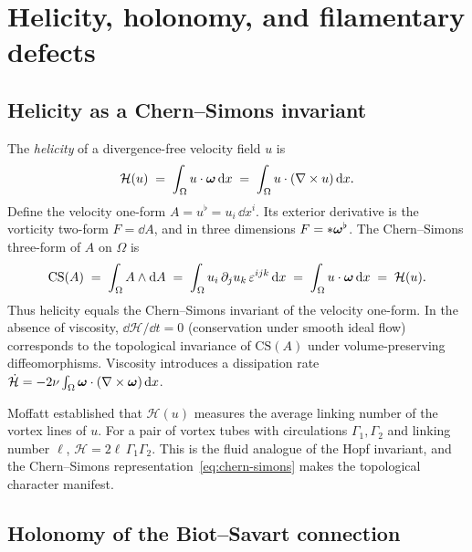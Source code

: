 \section{Helicity, holonomy, and filamentary defects}\label{sec:curv-helicity}

\subsection{Helicity as a Chern--Simons invariant}

The \emph{helicity} of a divergence-free velocity field $u$ is
\begin{equation}\label{eq:helicity-def}
  \mathcal{H}(u) \;=\; \int_\Omega u\cdot\boldsymbol{\omega}\,\mathrm{d} x
                  \;=\; \int_\Omega u\cdot(\nabla\times u)\,\mathrm{d} x.
\end{equation}
Define the velocity one-form $A = u^\flat = u_i\,\dd x^i$.  Its exterior derivative
is the vorticity two-form $F = \dd A$, and in three dimensions $F = *\boldsymbol{\omega}^\flat$.
The Chern--Simons three-form of $A$ on $\Omega$ is
\begin{equation}\label{eq:chern-simons}
  \mathrm{CS}(A) \;=\; \int_\Omega A \wedge \mathrm{d} A
  \;=\; \int_\Omega u_i\,\partial_j u_k\,\varepsilon^{ijk}\,\mathrm{d} x
  \;=\; \int_\Omega u\cdot\boldsymbol{\omega}\,\mathrm{d} x
  \;=\; \mathcal{H}(u).
\end{equation}
Thus helicity equals the Chern--Simons invariant of the velocity one-form.
In the absence of viscosity, $\dd \mathcal{H}/\dd t = 0$ (conservation under smooth ideal
flow) corresponds to the topological invariance of $\mathrm{CS}(A)$ under
volume-preserving diffeomorphisms.
Viscosity introduces a dissipation rate
$\dot{\mathcal{H}} = -2\nu\int_\Omega \boldsymbol{\omega}\cdot(\nabla\times\boldsymbol{\omega})\,\mathrm{d} x$.

\begin{remark}\label{rem:helicity-topological}
  Moffatt \cite{moffatt1969degree} established that $\mathcal{H}(u)$ measures the
  average linking number of the vortex lines of $u$.  For a pair of vortex tubes with
  circulations $\Gamma_1, \Gamma_2$ and linking number $\ell$,
  $\mathcal{H} = 2\ell\,\Gamma_1\Gamma_2$.
  This is the fluid analogue of the Hopf invariant, and the Chern--Simons
  representation~\eqref{eq:chern-simons} makes the topological character manifest.
\end{remark}

\subsection{Holonomy of the Biot--Savart connection}

